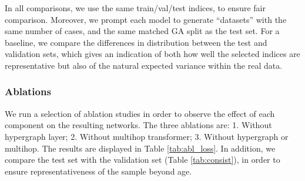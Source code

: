 \documentclass[sigconf, review]{acmart}
\begin{document}
In all comparisons, we use the same train/val/test indices, to ensure fair comparison. Moreover, we prompt each model to generate ``datasets'' with the same number of cases, and the same matched GA split as the test set. For a baseline, we compare the differences in distribution between the test and validation sets, which gives an indication of both how well the selected indices are representative but also of the natural expected variance within the real data. 



\subsubsection{Ablations}

We run a selection of ablation studies in order to observe the effect of each component on the resulting networks. The three ablations are: 1. Without hypergraph layer; 2. Without multihop transformer; 3. Without hypergraph or multihop. The results are displayed in Table \ref{tab:abl_loss}.
In addition, we compare the test set with the validation set (Table \ref{tab:consist}), in order to ensure representativeness of the sample beyond age.

\end{document}
